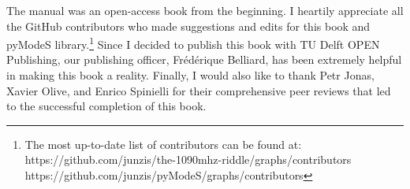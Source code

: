{The manual was an open-access book from the beginning. I heartily appreciate all the GitHub contributors who made suggestions and edits for this book and pyModeS library.\footnote{The most up-to-date list of contributors can be found at: \\https://github.com/junzis/the-1090mhz-riddle/graphs/contributors \\https://github.com/junzis/pyModeS/graphs/contributors} Since I decided to publish this book with TU Delft OPEN Publishing, our publishing officer, Fr\'ed\'erique Belliard, has been extremely helpful in making this book a reality. Finally, I would also like to thank Petr Jonas, Xavier Olive, and Enrico Spinielli for their comprehensive peer reviews that led to the successful completion of this book.
}